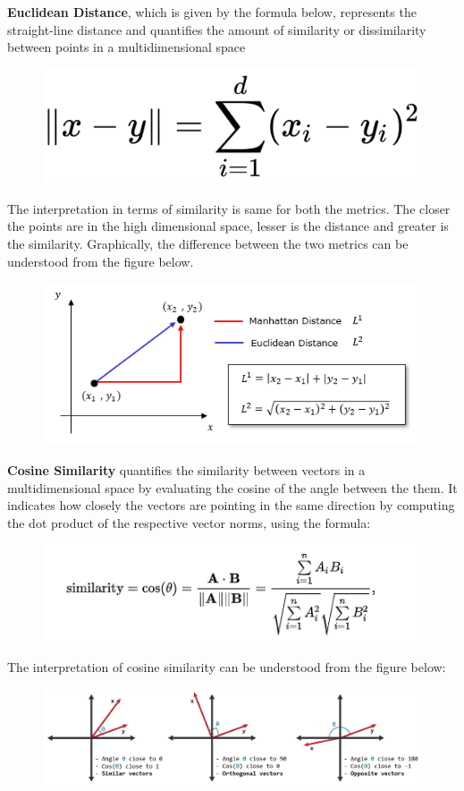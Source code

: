 \documentclass{article}
\begin{document}
\textbf{Euclidean Distance}, which is given by the formula below, represents the straight-line distance and quantifies the amount of similarity or dissimilarity between points in a multidimensional space

\begin{figure}[H]
    \centering
    \includegraphics[width=0.4\linewidth]{Images/euclidean.png}
\end{figure}

The interpretation in terms of similarity is same for both the metrics. The closer the points are in the high dimensional space, lesser is the distance and greater is the similarity. Graphically, the difference between the two metrics can be understood from the figure below.

\begin{figure}[H]
    \centering
    \includegraphics[width=0.7\linewidth]{Images/man euc graphical.png}
\end{figure}

\textbf{Cosine Similarity} quantifies the similarity between vectors in a multidimensional space by evaluating the cosine of the angle between the them. It indicates how closely the vectors are pointing in the same direction by computing the dot product of the respective vector norms, using the formula:

\begin{figure}[H]
    \centering
    \includegraphics[width=0.7\linewidth]{Images/cosine-similarity.png}
\end{figure}

The interpretation of cosine similarity can be understood from the figure below:

\begin{figure}[H]
    \centering
    \includegraphics[width=0.7\linewidth]{Images/cos sim.jpg}
\end{figure}
\end{document}
